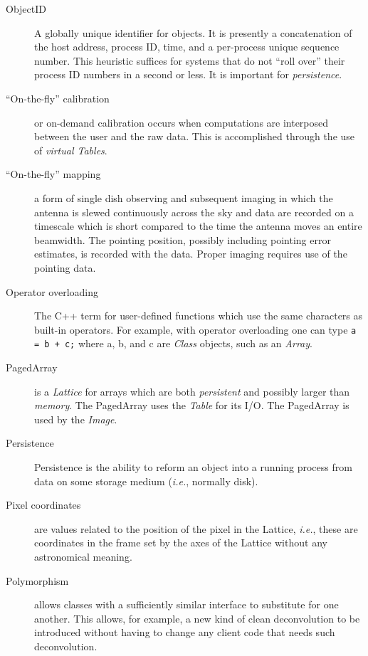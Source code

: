 \begin{description}
\item[ObjectID]
A globally unique identifier for objects. It is presently a
concatenation of the host address, process ID, time, and a per-process
unique sequence number. This heuristic suffices for systems that do
not ``roll over'' their process ID numbers in a second or less. It is
important for {\em persistence}.


\item[``On-the-fly'' calibration]
or on-demand calibration occurs when computations are interposed
between the user and the raw data. This is accomplished through the
use of {\em virtual Tables}.


\item[``On-the-fly'' mapping]
a form of single dish observing and subsequent imaging in which the
antenna is slewed continuously across the sky and data are recorded on
a timescale which is short compared to the time the antenna moves an
entire beamwidth.  The pointing position, possibly including pointing
error estimates, is recorded with the data.  Proper imaging requires
use of the pointing data.

\item[Operator overloading] The C++ term for user-defined functions
which use the same characters as built-in operators. For example, with
operator overloading one can type {\tt a = b + c;} where a, b, and c
are {\em Class} objects, such as an {\em Array}.


\item[PagedArray] is a {\em Lattice} for arrays which are both {\em
persistent} and possibly larger than {\em memory}. The PagedArray uses
the {\em Table} for its I/O. The PagedArray is used by the {\em Image}.


\item[Persistence] Persistence is the ability to reform an object into
a running process from data on some storage medium ({\em i.e.}, normally disk).


\item[Pixel coordinates] are values related to the position of the
pixel in the Lattice, {\em i.e.}, these are coordinates in the frame
set by the axes of the Lattice without any astronomical meaning.


\item[Polymorphism] allows classes with a sufficiently similar
interface to substitute for one another. This allows, for example, a
new kind of clean deconvolution to be introduced without having to
change any client code that needs such deconvolution.



\end{description}
